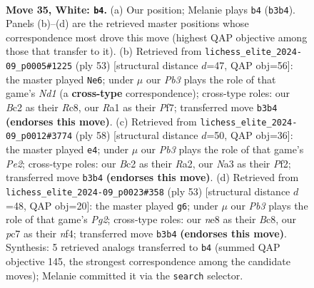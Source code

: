 \documentclass[11pt]{article}
\begin{document}
\clearpage

\begin{figure}[p]\centering
\begin{subfigure}{0.46\textwidth}\centering
\resizebox{\linewidth}{!}{%
\newchessgame
\chessboard[
  setfen={r3n3/pbpp4/1p4k1/5p1p/2P2P2/NP6/P1BPK2P/R7 w - - 8 35},
  showmover=false,
  pgfstyle=straightmove, color=movearrow, markmove={b3-b4}
]}
\caption{}
\end{subfigure}\hfill
\begin{subfigure}{0.46\textwidth}\centering
\resizebox{\linewidth}{!}{%
\newchessgame
\chessboard[
  setfen={2rn2k1/5p2/pb3p1p/4p3/1pP1P3/1P6/2B1NPPP/4R1K1 b - - 0 27},
  showmover=false,
  pgfstyle=straightmove, color=movearrow, markmove={d8-e6}
]}
\caption{}
\end{subfigure}
\\[4pt]
\begin{subfigure}{0.46\textwidth}\centering
\resizebox{\linewidth}{!}{%
\newchessgame
\chessboard[
  setfen={r7/5kp1/2pb1p1p/4p3/pP6/2BP2P1/R3PP1P/5K2 w - - 2 30},
  showmover=false,
  pgfstyle=straightmove, color=movearrow, markmove={e2-e4}
]}
\caption{}
\end{subfigure}\hfill
\begin{subfigure}{0.46\textwidth}\centering
\resizebox{\linewidth}{!}{%
\newchessgame
\chessboard[
  setfen={2b2r1k/ppn3pp/2p5/5p2/1P3N1P/P3P3/2B2PP1/3R2K1 b - - 0 27},
  showmover=false,
  pgfstyle=straightmove, color=movearrow, markmove={g7-g6}
]}
\caption{}
\end{subfigure}
\caption{\textbf{Move 35, White: \texttt{b4}.} (a) Our position; Melanie plays \texttt{b4} (\texttt{b3b4}). Panels (b)--(d) are the retrieved master positions whose correspondence most drove this move (highest QAP objective among those that transfer to it). (b) Retrieved from \texttt{lichess\_elite\_2024-09\_p0005\#1225} (ply 53) [structural distance $d$=47, QAP obj=56]: the master played \texttt{Ne6}; under $\mu$ our \emph{Pb3} plays the role of that game's \emph{Nd1} (a \textbf{cross-type} correspondence); cross-type roles: our \emph{B}c2 as their \emph{R}c8, our \emph{R}a1 as their \emph{P}f7; transferred move \texttt{b3b4} \textbf{(endorses this move)}. (c) Retrieved from \texttt{lichess\_elite\_2024-09\_p0012\#3774} (ply 58) [structural distance $d$=50, QAP obj=36]: the master played \texttt{e4}; under $\mu$ our \emph{Pb3} plays the role of that game's \emph{Pe2}; cross-type roles: our \emph{B}c2 as their \emph{R}a2, our \emph{N}a3 as their \emph{P}f2; transferred move \texttt{b3b4} \textbf{(endorses this move)}. (d) Retrieved from \texttt{lichess\_elite\_2024-09\_p0023\#358} (ply 53) [structural distance $d$=48, QAP obj=20]: the master played \texttt{g6}; under $\mu$ our \emph{Pb3} plays the role of that game's \emph{Pg2}; cross-type roles: our \emph{n}e8 as their \emph{B}c8, our \emph{p}c7 as their \emph{n}f4; transferred move \texttt{b3b4} \textbf{(endorses this move)}. Synthesis: 5 retrieved analogs transferred to \texttt{b4} (summed QAP objective 145, the strongest correspondence among the candidate moves); Melanie committed it via the \texttt{search} selector.}
\label{fig:thought-m68}
\end{figure}
\end{document}
